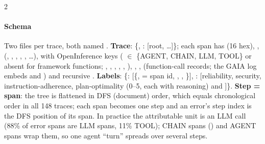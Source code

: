 \begin{multicols}{2}
\paragraph{Schema} Two files per trace, both named . \textbf{Trace}: \{, : [root, \ldots]\}; each span has  (16 hex), ,  (, , , , , \ldots),  with OpenInference keys ( $\in$ \{AGENT, CHAIN, LLM, TOOL\} or absent for framework functions; , , , , , ), , ,  (function-call records; the GAIA  log embeds  and ) and recursive . \textbf{Labels}: \{: [\{,  = span id, , , \}], : [reliability, security, instruction-adherence, plan-optimality (0--5, each with reasoning) and ]\}. \textbf{Step = span}: the tree is flattened in DFS (document) order, which equals chronological order in all 148 traces; each span becomes one step and an error's step index is the DFS position of its  span. In practice the attributable unit is an LLM call (88\% of error spans are LLM spans, 11\% TOOL); CHAIN spans () and AGENT spans wrap them, so one agent ``turn'' spreads over several steps.
\end{multicols}

